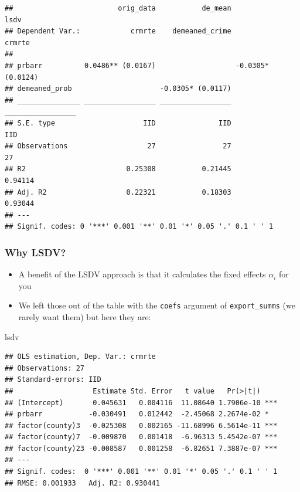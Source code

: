 \documentclass[
]{article}
\newenvironment{Shaded}{\begin{snugshade}}{\end{snugshade}}
\newcommand{\NormalTok}[1]{#1}
\providecommand{\tightlist}{%
  \setlength{\itemsep}{0pt}\setlength{\parskip}{0pt}}
\begin{document}
\begin{verbatim}
##                         orig_data           de_mean              lsdv
## Dependent Var.:            crmrte    demeaned_crime            crmrte
##                                                                      
## prbarr          0.0486** (0.0167)                   -0.0305* (0.0124)
## demeaned_prob                     -0.0305* (0.0117)                  
## _______________ _________________ _________________ _________________
## S.E. type                     IID               IID               IID
## Observations                   27                27                27
## R2                        0.25308           0.21445           0.94114
## Adj. R2                   0.22321           0.18303           0.93044
## ---
## Signif. codes: 0 '***' 0.001 '**' 0.01 '*' 0.05 '.' 0.1 ' ' 1
\end{verbatim}

\hypertarget{why-lsdv}{%
\subsubsection{Why LSDV?}\label{why-lsdv}}

\begin{itemize}
\tightlist
\item
  A benefit of the LSDV approach is that it calculates the fixed effects
  \(\alpha_i\) for you
\item
  We left those out of the table with the \texttt{coefs} argument of
  \texttt{export\_summs} (we rarely want them) but here they are:
\end{itemize}

\begin{Shaded}
\begin{Highlighting}[]
\NormalTok{lsdv}
\end{Highlighting}
\end{Shaded}

\begin{verbatim}
## OLS estimation, Dep. Var.: crmrte
## Observations: 27 
## Standard-errors: IID 
##                   Estimate Std. Error   t value   Pr(>|t|)    
## (Intercept)       0.045631   0.004116  11.08640 1.7906e-10 ***
## prbarr           -0.030491   0.012442  -2.45068 2.2674e-02 *  
## factor(county)3  -0.025308   0.002165 -11.68996 6.5614e-11 ***
## factor(county)7  -0.009870   0.001418  -6.96313 5.4542e-07 ***
## factor(county)23 -0.008587   0.001258  -6.82651 7.3887e-07 ***
## ---
## Signif. codes:  0 '***' 0.001 '**' 0.01 '*' 0.05 '.' 0.1 ' ' 1
## RMSE: 0.001933   Adj. R2: 0.930441
\end{verbatim}
\end{document}
